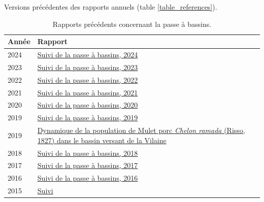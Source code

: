 \documentclass[11pt,twocolumn,titlepage,twoside]{article}\usepackage[]{graphicx}\usepackage[]{xcolor}
\begin{document}
\clearpage
Versions précédentes des rapports annuels (table \ref{table_references}).


\begin{table}[htbp]
\centering
\caption{Rapports précédents concernant la passe à bassins.}
\begin{tabular}{lp{7cm}}
\toprule
Année & Rapport \\
\midrule
2024 &
\href{https://eptbvilaine56.sharepoint.com/:b:/g/extranet/IQBVsT9_BeqASbWz-IilJEz3AUCBlAPxvKa5Flsk1U2XHMo?e=WSiWpH}{Suivi
de la passe à bassins, 2024}\\
2023 &
\href{https://eptbvilaine56.sharepoint.com/:b:/g/extranet/EYivEAGQThBKiYqQJJA_A6MBQnb0H1cLQzqHLQpH5bvEyw?e=Tkm3RY}{Suivi
de la passe à bassins, 2023}\\
2022 &
\href{https://eptbvilaine56.sharepoint.com/:b:/g/extranet/EUqlfhsKgqpMkzWSuEo9uRABXEw73VtgoVhM8t-C6zGTiQ?e=7w6tii}{Suivi
de la passe à bassins, 2022}\\
2021 &
\href{https://eptbvilaine56.sharepoint.com/:b:/g/extranet/ESot35-t3RFPo6Gc4X3NxkgBkvRkIochrpfMnuzpBCNZaw?e=c3Qbrv}{Suivi
de la passe à bassins, 2021}\\
2020 &
\href{https://eptbvilaine56.sharepoint.com/:b:/g/extranet/EeLSKt0Q_qxMqW6p5D4-ZIwBBBTGqgeJwmOQfIjQ3AfdWw?e=woq9fI}{Suivi
de la passe à bassins, 2020}\\
2019 &
\href{https://eptbvilaine56.sharepoint.com/:b:/g/extranet/EX0SnyoGmBlMsO-6-Il8wugBCHYxha3l2A-5tA9yTCqwbg?e=kNBHJd}{Suivi
de la passe à bassins, 2019}\\
2019 &
\href{https://eptbvilaine56.sharepoint.com/:b:/g/extranet/Eae-mGNEl0VHtdehKYfYHPcBwTXL4qV_AvuPRLJAa1eGuA?e=2cq3Bn}{Dynamique
de la population de Mulet porc \textit{Chelon ramada} (Risso, 1827) dans le
bassin versant de la Vilaine}\\
2018 &
\href{https://eptbvilaine56.sharepoint.com/:b:/g/extranet/EZddtXquW7NMjK-GwjxsDGoBD7BJw9gGTplSoalP8BHaEA?e=Tn5HXK}{Suivi
de la passe à bassins, 2018}\\
2017 &
\href{https://eptbvilaine56.sharepoint.com/:b:/g/extranet/ETdJfcpV1pZMv6BapxKjUX4BLqwMqJy7txGuPWJv2aAYOg?e=lwXGLw}{Suivi
de la passe à bassins, 2017}\\
2016 &
\href{https://eptbvilaine56.sharepoint.com/:b:/g/extranet/ES85jK5Bv0JMsTOjcf93iicB5a35QRyWhWUrSiF5qfdtog?e=ws3ARj}{Suivi
de la passe à bassins, 2016}\\
2015 &
\href{https://eptbvilaine56.sharepoint.com/:b:/g/extranet/EUaIB9CdQItLkPTR0banFZYBv7DnfD7uNSezUSFVD9tfcw?e=ZAWC9t}{Suivi
}
\end{tabular}
\end{table}
\end{document}
